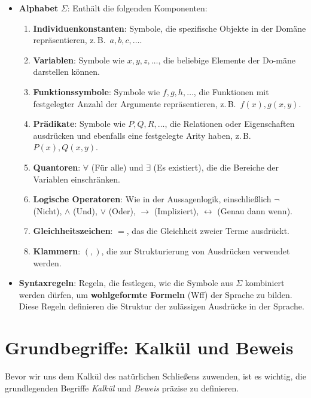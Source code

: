 \documentclass[main.tex]{subfiles}
\begin{document}
\begin{itemize}
    \item \textbf{Alphabet} \( \Sigma \): Enthält die folgenden Komponenten:
    \begin{enumerate}
        \item \textbf{Individuenkonstanten}: Symbole, die spezifische Objekte in der Domäne repräsentieren, z.\,B.\ \( a, b, c, \ldots \).
        \item \textbf{Variablen}: Symbole wie \( x, y, z, \ldots \), die beliebige Elemente der Do-mäne darstellen können.
        \item \textbf{Funktionssymbole}: Symbole wie \( f, g, h, \ldots \), die Funktionen mit festgelegter Anzahl der Argumente repräsentieren, z.\,B.\ \( f(x), g(x, y) \).
        \item \textbf{Prädikate}: Symbole wie \( P, Q, R, \ldots \), die Relationen oder Eigenschaften ausdrücken und ebenfalls eine festgelegte Arity haben, z.\,B.\ \( P(x), Q(x, y) \).
        \item \textbf{Quantoren}: \( \forall \) (Für alle) und \( \exists \) (Es existiert), die die Bereiche der Variablen einschränken.
        \item \textbf{Logische Operatoren}: Wie in der Aussagenlogik, einschließlich \( \neg \) (Nicht), \( \land \) (Und), \( \lor \) (Oder), \( \rightarrow \) (Impliziert), \( \leftrightarrow \) (Genau dann wenn).
        \item \textbf{Gleichheitszeichen}: \( = \), das die Gleichheit zweier Terme ausdrückt.
        \item \textbf{Klammern}: \( (, ) \), die zur Strukturierung von Ausdrücken verwendet werden.
    \end{enumerate}
    
    \item \textbf{Syntaxregeln}: Regeln, die festlegen, wie die Symbole aus \( \Sigma \) kombiniert werden dürfen, um \textbf{wohlgeformte Formeln} (Wff) der Sprache zu bilden. Diese Regeln definieren die Struktur der zulässigen Ausdrücke in der Sprache.
\end{itemize}

\section{Grundbegriffe: Kalkül und Beweis}

Bevor wir uns dem Kalkül des natürlichen Schließens zuwenden, ist es wichtig, die grundlegenden Begriffe \textit{Kalkül} und \textit{Beweis} präzise zu definieren.
\end{document}
